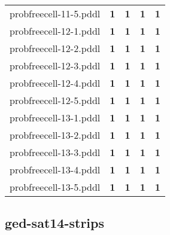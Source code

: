 \documentclass{article}
\begin{document}
\begin{tabular}{@{}lrrrr@{}}
probfreecell-11-5.pddl & \textbf{1} & \textbf{1} & \textbf{1} & \textbf{1} \\
probfreecell-12-1.pddl & \textbf{1} & \textbf{1} & \textbf{1} & \textbf{1} \\
probfreecell-12-2.pddl & \textbf{1} & \textbf{1} & \textbf{1} & \textbf{1} \\
probfreecell-12-3.pddl & \textbf{1} & \textbf{1} & \textbf{1} & \textbf{1} \\
probfreecell-12-4.pddl & \textbf{1} & \textbf{1} & \textbf{1} & \textbf{1} \\
probfreecell-12-5.pddl & \textbf{1} & \textbf{1} & \textbf{1} & \textbf{1} \\
probfreecell-13-1.pddl & \textbf{1} & \textbf{1} & \textbf{1} & \textbf{1} \\
probfreecell-13-2.pddl & \textbf{1} & \textbf{1} & \textbf{1} & \textbf{1} \\
probfreecell-13-3.pddl & \textbf{1} & \textbf{1} & \textbf{1} & \textbf{1} \\
probfreecell-13-4.pddl & \textbf{1} & \textbf{1} & \textbf{1} & \textbf{1} \\
probfreecell-13-5.pddl & \textbf{1} & \textbf{1} & \textbf{1} & \textbf{1} \\
\end{tabular}

\hypertarget{coverage-ged-sat14-strips}{}
\subsection*{ged-sat14-strips}
\end{document}
